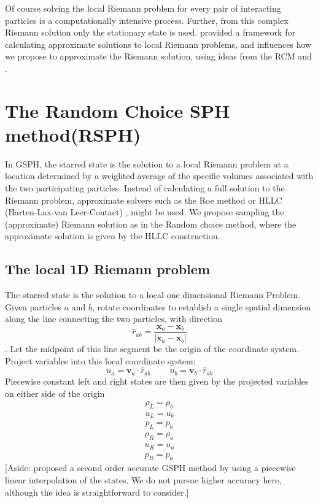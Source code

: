 Of course solving the local Riemann problem for every pair of interacting particles is a computationally intensive process. Further, from this complex Riemann solution only the stationary state is used. \citet{hll} provided a framework for calculating approximate solutions to local Riemann problems, and influences how we propose to approximate the  Riemann solution, using ideas from the RCM and \citet{hartenlax}.

\section{The Random Choice SPH method(RSPH)} \label{sec:RSPH-method}
In GSPH, the starred state is the solution to a local Riemann problem at a location determined by a weighted average of the specific volumes associated with the two participating particles. 
Instead of calculating a full solution to the Riemann problem, approximate solvers such as the Roe method \citep{roe1981approximate} or HLLC (Harten-Lax-van Leer-Contact) \citep{toro1994restoration}, might be used. 
We propose sampling the (approximate) Riemann solution as in the Random choice method, where the approximate solution is given by the HLLC construction.

\subsection{The local 1D Riemann problem} \label{sec:RP-construction}
The starred state is the solution to a local one dimensional Riemann Problem. Given particles $a$ and $b$, rotate coordinates to establish a single spatial dimension along the line connecting the two particles, with direction 
\begin{equation}
\hat{r}_{a b}= \frac{\textbf{x}_{a} - \textbf{x}_{ b}}{|\textbf{x}_{a} - \textbf{x}_{ b}|}
\end{equation}. 
Let the midpoint of this line segment be the origin of the coordinate system. Project variables into this local coordinate system:
\begin{equation}
u_{a}= \textbf{v}_{a} \cdot \hat{r}_{a b}
~~~~~~~~~~
u_{b}= \textbf{v}_{b} \cdot \hat{r}_{a b}
\label{eq:RP-project-2-local}
\end{equation}
Piecewise constant left and right states are then given by the projected variables on either side of the origin
\begin{eqnarray}
\rho_L = \rho_b 
\label{eq:Riemann-Prob-define-L-rho} \\
u_L = u_b 
\label{eq:Riemann-Prob-define-L-v} \\
p_L = p_b 
\label{eq:Riemann-Prob-define-L-p}
\end{eqnarray}
\begin{eqnarray}
\rho_R = \rho_a 
\label{eq:Riemann-Prob-define-R-rho} \\
u_R = u_a 
\label{eq:Riemann-Prob-define-R-v} \\
p_R = p_a 
\label{eq:Riemann-Prob-define-R-p}
\end{eqnarray}
[Aside:  \citet{inutsuka2002reformulation} proposed a second order accurate GSPH method by using
a piecewise linear interpolation of the states. We do not pursue higher accuracy here, although the idea is straightforward to consider.]

